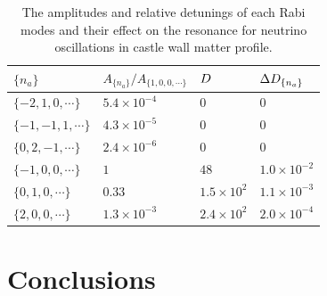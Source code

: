\begin{table}
    \centering
    \setlength\tabcolsep{10pt}
    \begin{tabular}{llll}
    \hline
    \hline
     $\{n_a\}$ & $A_{\{n_a\}}/A_{\{1,0,0,\cdots\}}$  & $D$ & $\Delta D_{\{n_a\}}$  \\
    \hline
    $\{-2, 1, 0,\cdots\}$ & $5.4\times 10^{-4}$ & 0 &  0 \\
    $\{-1, -1, 1,\cdots\}$ &  $4.3\times 10^{-5}$ & 0 & 0 \\
    $\{0, 2, -1,\cdots\}$ & $2.4\times 10^{-6}$ & 0 & 0 \\
    \hline
     $\{-1,0, 0, \cdots\}$ & $1$ & $48$ &  $1.0\times 10^{-2}$ \\
     $\{0,1, 0, \cdots\}$ & $0.33$ & $1.5\times 10^2$ &  $1.1\times 10^{-3}$  \\
     $\{2,0, 0, \cdots\}$ & $1.3\times 10^{-3}$ & $2.4\times 10^{2}$ & $2.0\times 10^{-4}$ \\
     \hline
     \hline
    \end{tabular}
    \caption{\label{tab-q-values-each-mode}The amplitudes and relative detunings of each Rabi modes and their effect on the resonance for neutrino oscillations in castle wall matter profile.}
\end{table}




\section{\label{conclusions}Conclusions}

